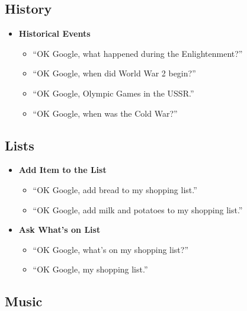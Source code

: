 \documentclass[
  jou,
  floatsintext,
  longtable,
  a4paper,
  nolmodern,
  notxfonts,
  notimes,
  12pt,
  colorlinks=true,linkcolor=blue,citecolor=blue,urlcolor=blue]{apa7}
\providecommand{\tightlist}{%
  \setlength{\itemsep}{0pt}\setlength{\parskip}{0pt}}
\begin{document}
\subsection{History}\label{history}

\begin{itemize}
\tightlist
\item
  \textbf{Historical Events}

  \begin{itemize}
  \tightlist
  \item
    ``OK Google, what happened during the Enlightenment?''
  \item
    ``OK Google, when did World War 2 begin?''
  \item
    ``OK Google, Olympic Games in the USSR.''
  \item
    ``OK Google, when was the Cold War?''
  \end{itemize}
\end{itemize}

\subsection{Lists}\label{lists}

\begin{itemize}
\tightlist
\item
  \textbf{Add Item to the List}

  \begin{itemize}
  \tightlist
  \item
    ``OK Google, add bread to my shopping list.''
  \item
    ``OK Google, add milk and potatoes to my shopping list.''
  \end{itemize}
\item
  \textbf{Ask What's on List}

  \begin{itemize}
  \tightlist
  \item
    ``OK Google, what's on my shopping list?''
  \item
    ``OK Google, my shopping list.''
  \end{itemize}
\end{itemize}

\subsection{Music}\label{music}
\end{document}
